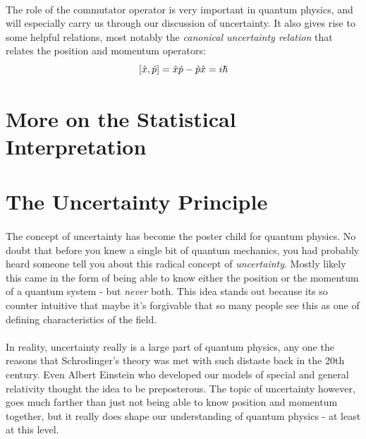 \documentclass[12pt,letterpaper]{book}
\begin{document}
\paragraph*{}The role of the commutator operator is very important in quantum physics, and will especially carry us through our discussion of uncertainty. It also gives rise to some helpful relations, most notably the \textit{canonical uncertainty relation} that relates the position and momentum operators:
\begin{equation}
\comm{\hat{x}}{\hat{p}} = \hat{x}\hat{p} - \hat{p}\hat{x} = i\hbar
\end{equation}



\section{More on the Statistical Interpretation}


\section{The Uncertainty Principle}
\paragraph*{}The concept of uncertainty has become the poster child for quantum physics. No doubt that before you knew a single bit of quantum mechanics, you had probably heard someone tell you about this radical concept of \textit{uncertainty}. Mostly likely this came in the form of being able to know either the position or the momentum of a quantum system - but \textit{never} both. This idea stands out because its so counter intuitive that maybe it's forgivable that so many people see this as one of defining characteristics of the field.
\paragraph*{}In reality, uncertainty really is a large part of quantum physics, any one the reasons that Schrodinger's theory was met with such distaste back in the 20th century. Even Albert Einstein who developed our models of special and general relativity thought the idea to be preposterous. The topic of uncertainty however, goes much farther than just not being able to know position and momentum together, but it really does shape our understanding of quantum physics - at least at this level.
\end{document}

